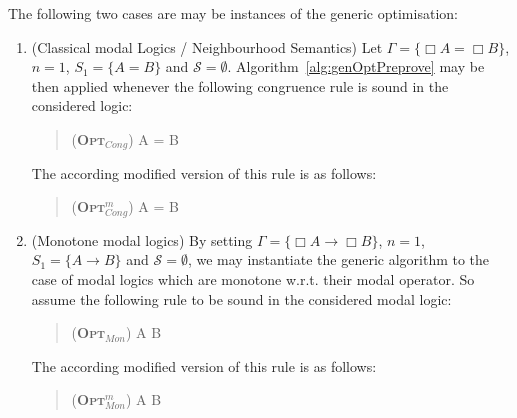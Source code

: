 \documentclass{entcs} \usepackage{entcsmacro}
\begin{document}
\begin{example}
The following two cases are may be instances of the generic optimisation:
\begin{enumerate}
\item (Classical modal Logics / Neighbourhood Semantics) Let $\Gamma = \{\Box A = \Box B\}$,
$n=1$, $S_1=\{A=B\}$ and $\mathcal{S}=\emptyset$. Algorithm~\ref{alg:genOptPreprove}
may be then applied whenever the following congruence rule is sound in the considered
logic:\\

\begin{quote}
\begin{center}
      (\textsc {\textbf{Opt}$_{Cong}$}) 
                      { \Box A = \Box B }
  \end{center}
\end{quote}
\vspace{10pt}
The according modified version of this rule is as follows:\\

\begin{quote}
\begin{center}
      (\textsc {\textbf{Opt}$^m_{Cong}$}) 
                      { \Box A = \Box B }
  \end{center}
\end{quote}

\item (Monotone modal logics) By setting $\Gamma = \{\Box A \rightarrow \Box B\}$,
$n=1$, $S_1=\{A\rightarrow B\}$ and $\mathcal{S}=\emptyset$, we may instantiate
the generic algorithm to the case of modal logics which are monotone w.r.t. their
modal operator. So assume the following rule to be sound in  the considered modal
logic:\\

\begin{quote}
\begin{center}
      (\textsc {\textbf{Opt}$_{Mon}$}) 
                      { \Box A \rightarrow \Box B }
  \end{center}
\end{quote}
\vspace{10pt}
The according modified version of this rule is as follows:\\

\begin{quote}
\begin{center}
      (\textsc {\textbf{Opt}$^m_{Mon}$}) 
                      { \Box A \rightarrow \Box B }
  \end{center}
\end{quote}


\end{enumerate}
\end{example}
\end{document}

